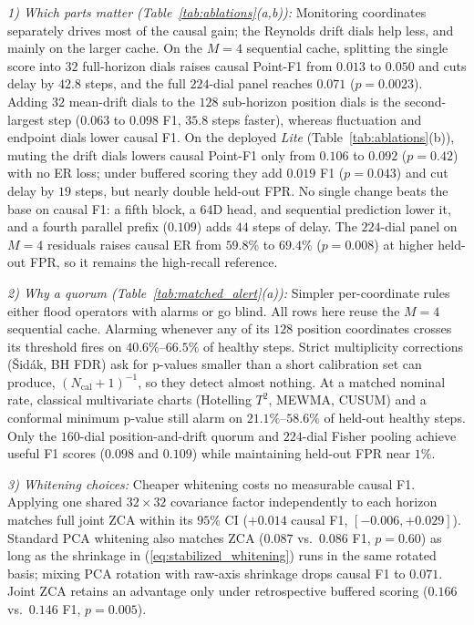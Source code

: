 \noindent\emph{1) Which parts matter (Table~\ref{tab:ablations}(a,b)):} Monitoring coordinates separately drives most of the causal gain; the Reynolds drift dials help less, and mainly on the larger cache. On the $M{=}4$ sequential cache, splitting the single score into $32$ full-horizon dials raises causal Point-F1 from $0.013$ to $0.050$ and cuts delay by $42.8$ steps, and the full $224$-dial panel reaches $0.071$ ($p=0.0023$). Adding $32$ mean-drift dials to the $128$ sub-horizon position dials is the second-largest step ($0.063$ to $0.098$ F1, $35.8$ steps faster), whereas fluctuation and endpoint dials lower causal F1. On the deployed \emph{Lite} (Table~\ref{tab:ablations}(b)), muting the drift dials lowers causal Point-F1 only from $0.106$ to $0.092$ ($p=0.42$) with no ER loss; under buffered scoring they add $0.019$ F1 ($p=0.043$) and cut delay by $19$ steps, but nearly double held-out FPR. No single change beats the base on causal F1: a fifth block, a $64$D head, and sequential prediction lower it, and a fourth parallel prefix ($0.109$) adds $44$ steps of delay. The $224$-dial panel on $M{=}4$ residuals raises causal ER from $59.8\%$ to $69.4\%$ ($p=0.008$) at higher held-out FPR, so it remains the high-recall reference.

\noindent\emph{2) Why a quorum (Table~\ref{tab:matched_alert}(a)):} Simpler per-coordinate rules either flood operators with alarms or go blind. All rows here reuse the $M{=}4$ sequential cache. Alarming whenever any of its $128$ position coordinates crosses its threshold fires on $40.6\%\text{--}66.5\%$ of healthy steps. Strict multiplicity corrections (\v{S}id\'{a}k, BH FDR) ask for p-values smaller than a short calibration set can produce, $(N_{\text{cal}}+1)^{-1}$, so they detect almost nothing. At a matched nominal rate, classical multivariate charts (Hotelling $T^2$, MEWMA, CUSUM) and a conformal minimum p-value still alarm on $21.1\%\text{--}58.6\%$ of held-out healthy steps. Only the $160$-dial position-and-drift quorum and $224$-dial Fisher pooling achieve useful F1 scores ($0.098$ and $0.109$) while maintaining held-out FPR near $1\%$.

\noindent\emph{3) Whitening choices:} Cheaper whitening costs no measurable causal F1. Applying one shared $32\times 32$ covariance factor independently to each horizon matches full joint ZCA within its $95\%$ CI ($+0.014$ causal F1, $[-0.006, +0.029]$). Standard PCA whitening also matches ZCA ($0.087$ vs.\ $0.086$ F1, $p=0.60$) as long as the shrinkage in (\ref{eq:stabilized_whitening}) runs in the same rotated basis; mixing PCA rotation with raw-axis shrinkage drops causal F1 to $0.071$. Joint ZCA retains an advantage only under retrospective buffered scoring ($0.166$ vs.\ $0.146$ F1, $p=0.005$).

